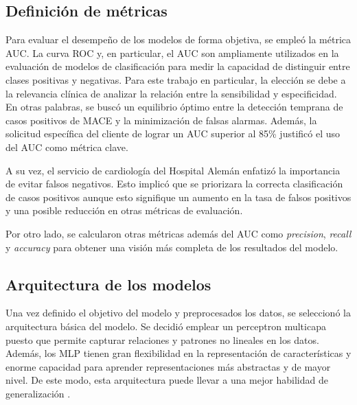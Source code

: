 \subsection{Definición de métricas}

Para evaluar el desempeño de los modelos de forma objetiva, se empleó la métrica AUC. La curva ROC y, 
en particular, el AUC son ampliamente utilizados en la evaluación de modelos de clasificación para 
medir la capacidad de distinguir entre clases positivas y negativas. Para este trabajo en particular, 
la elección se debe a la relevancia clínica de analizar la relación entre la sensibilidad y especificidad. 
En otras palabras, se buscó un equilibrio óptimo entre la detección temprana de casos positivos de MACE 
y la minimización de falsas alarmas. Además, la solicitud específica del cliente de lograr un AUC superior 
al 85\% justificó el uso del AUC como métrica clave. 

A su vez, el servicio de cardiología del Hospital Alemán enfatizó la importancia de evitar falsos negativos. 
Esto implicó que se priorizara la correcta clasificación de casos positivos aunque esto signifique un aumento 
en la tasa de falsos positivos y una posible reducción en otras métricas de evaluación. 

Por otro lado, se calcularon otras métricas además del AUC como \emph{precision}, \emph{recall} y \emph{accuracy} 
para obtener una visión más completa de los resultados del modelo.


\subsection{Arquitectura de los modelos}
Una vez definido el objetivo del modelo y preprocesados los datos, se seleccionó la arquitectura básica del modelo. 
Se decidió emplear un perceptron multicapa puesto que permite capturar relaciones y patrones no lineales en los 
datos. Además, los MLP tienen gran flexibilidad en la representación de características y enorme capacidad para 
aprender representaciones más abstractas y de mayor nivel. De este modo, esta arquitectura puede llevar a una 
mejor habilidad de generalización \citep{CITE:35} \citep{CITE:44}. 


